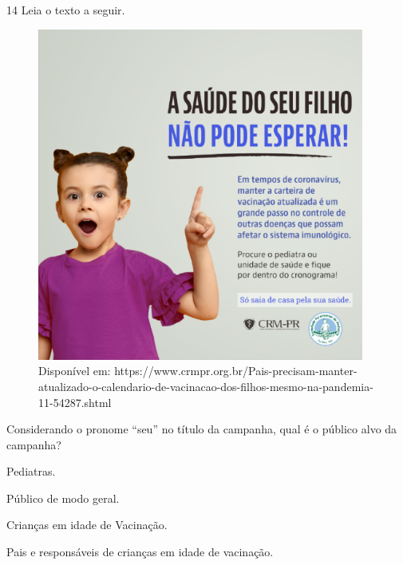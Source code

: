 \num{14} Leia o texto a seguir.

\begin{figure}[H]
\centering\includegraphics[width=4.23378in,height=4.3141in]{./imgSAEB_6_POR/media/image36.png}
\caption{Disponível em: https://www.crmpr.org.br/Pais-precisam-manter-atualizado-o-calendario-de-vacinacao-dos-filhos-mesmo-na-pandemia-11-54287.shtml}
\end{figure}

\noindent Considerando o pronome ``seu'' no título da campanha, qual é o público
alvo da campanha?

\begin{escolha}
\item Pediatras.
\item Público de modo geral.
\item Crianças em idade de Vacinação.
\item Pais e responsáveis de crianças em idade de vacinação.
\end{escolha}



